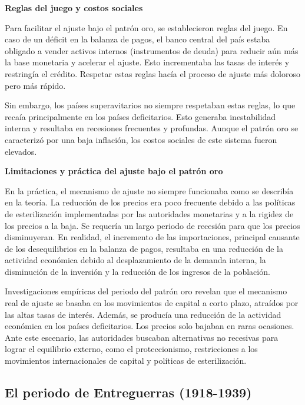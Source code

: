 \documentclass[
  letterpaper,
  DIV=11,
  numbers=noendperiod]{scrartcl}
\begin{document}
\textbf{Reglas del juego y costos sociales}

Para facilitar el ajuste bajo el patrón oro, se establecieron reglas del
juego. En caso de un déficit en la balanza de pagos, el banco central
del país estaba obligado a vender activos internos (instrumentos de
deuda) para reducir aún más la base monetaria y acelerar el ajuste. Esto
incrementaba las tasas de interés y restringía el crédito. Respetar
estas reglas hacía el proceso de ajuste más doloroso pero más rápido.

Sin embargo, los países superavitarios no siempre respetaban estas
reglas, lo que recaía principalmente en los países deficitarios. Esto
generaba inestabilidad interna y resultaba en recesiones frecuentes y
profundas. Aunque el patrón oro se caracterizó por una baja inflación,
los costos sociales de este sistema fueron elevados.

\textbf{Limitaciones y práctica del ajuste bajo el patrón oro}

En la práctica, el mecanismo de ajuste no siempre funcionaba como se
describía en la teoría. La reducción de los precios era poco frecuente
debido a las políticas de esterilización implementadas por las
autoridades monetarias y a la rigidez de los precios a la baja. Se
requería un largo periodo de recesión para que los precios disminuyeran.
En realidad, el incremento de las importaciones, principal causante de
los desequilibrios en la balanza de pagos, resultaba en una reducción de
la actividad económica debido al desplazamiento de la demanda interna,
la disminución de la inversión y la reducción de los ingresos de la
población.

Investigaciones empíricas del periodo del patrón oro revelan que el
mecanismo real de ajuste se basaba en los movimientos de capital a corto
plazo, atraídos por las altas tasas de interés. Además, se producía una
reducción de la actividad económica en los países deficitarios. Los
precios solo bajaban en raras ocasiones. Ante este escenario, las
autoridades buscaban alternativas no recesivas para lograr el equilibrio
externo, como el proteccionismo, restricciones a los movimientos
internacionales de capital y políticas de esterilización.

\hypertarget{el-periodo-de-entreguerras-1918-1939}{%
\subsection{El periodo de Entreguerras
(1918-1939)}\label{el-periodo-de-entreguerras-1918-1939}}
\end{document}
